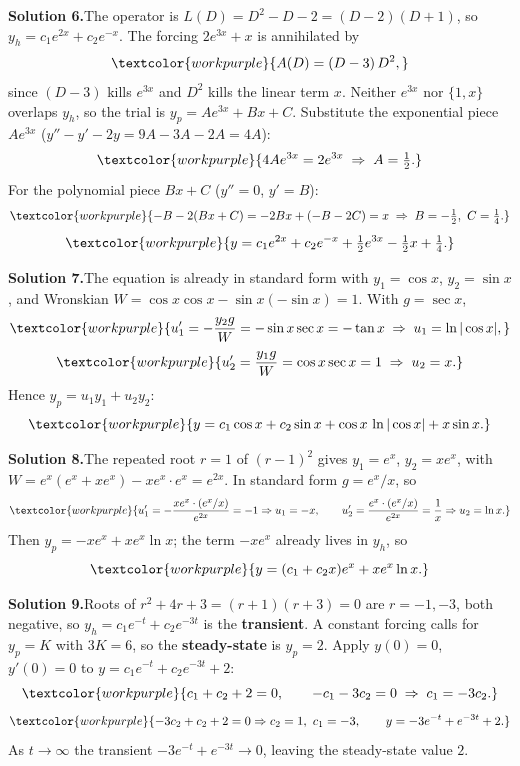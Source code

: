 \medskip
\noindent\textbf{Solution 6.}\quad The operator is $L(D) = D^2 - D - 2 = (D-2)(D+1)$,
so $y_h = c_1 e^{2x} + c_2 e^{-x}$. The forcing $2e^{3x} + x$ is annihilated by
\[ \textcolor{workpurple}{A(D) = (D-3)\,D^2,} \]
since $(D-3)$ kills $e^{3x}$ and $D^2$ kills the linear term $x$. Neither $e^{3x}$
nor $\{1, x\}$ overlaps $y_h$, so the trial is $y_p = A e^{3x} + Bx + C$.
Substitute the exponential piece $Ae^{3x}$ ($y''-y'-2y = 9A - 3A - 2A = 4A$):
\[ \textcolor{workpurple}{4A e^{3x} = 2 e^{3x} \;\Rightarrow\; A = \tfrac{1}{2}.} \]
For the polynomial piece $Bx + C$ ($y'' = 0$, $y' = B$):
\[ \textcolor{workpurple}{-B - 2(Bx + C) = -2Bx + (-B - 2C) = x \;\Rightarrow\; B = -\tfrac{1}{2},\ C = \tfrac{1}{4}.} \]
\[ \textcolor{workpurple}{y = c_1 e^{2x} + c_2 e^{-x} + \tfrac{1}{2} e^{3x} - \tfrac{1}{2}x + \tfrac{1}{4}.} \]

\medskip
\noindent\textbf{Solution 7.}\quad The equation is already in standard form with
$y_1 = \cos x$, $y_2 = \sin x$, and Wronskian
$W = \cos x\cos x - \sin x(-\sin x) = 1$. With $g = \sec x$,
\[ \textcolor{workpurple}{u_1' = -\frac{y_2 g}{W} = -\sin x \sec x = -\tan x \;\Rightarrow\; u_1 = \ln|\cos x|,} \]
\[ \textcolor{workpurple}{u_2' = \frac{y_1 g}{W} = \cos x \sec x = 1 \;\Rightarrow\; u_2 = x.} \]
Hence $y_p = u_1 y_1 + u_2 y_2$:
\[ \textcolor{workpurple}{y = c_1\cos x + c_2\sin x + \cos x\,\ln|\cos x| + x\sin x.} \]

\medskip
\noindent\textbf{Solution 8.}\quad The repeated root $r=1$ of $(r-1)^2$ gives
$y_1 = e^{x}$, $y_2 = x e^{x}$, with
$W = e^{x}(e^{x} + x e^{x}) - x e^{x}\cdot e^{x} = e^{2x}$. In standard form
$g = e^{x}/x$, so
\[ \textcolor{workpurple}{u_1' = -\frac{x e^{x}\cdot (e^{x}/x)}{e^{2x}} = -1 \Rightarrow u_1 = -x, \qquad
   u_2' = \frac{e^{x}\cdot (e^{x}/x)}{e^{2x}} = \frac{1}{x} \Rightarrow u_2 = \ln x.} \]
Then $y_p = -x e^{x} + x e^{x}\ln x$; the term $-x e^{x}$ already lives in $y_h$, so
\[ \textcolor{workpurple}{y = (c_1 + c_2 x)e^{x} + x e^{x}\ln x.} \]

\medskip
\noindent\textbf{Solution 9.}\quad Roots of $r^2 + 4r + 3 = (r+1)(r+3)=0$ are
$r=-1,-3$, both negative, so $y_h = c_1 e^{-t} + c_2 e^{-3t}$ is the
\textbf{transient}. A constant forcing calls for $y_p = K$ with $3K = 6$, so the
\textbf{steady-state} is $y_p = 2$. Apply $y(0)=0$, $y'(0)=0$ to
$y = c_1 e^{-t} + c_2 e^{-3t} + 2$:
\[ \textcolor{workpurple}{c_1 + c_2 + 2 = 0, \qquad -c_1 - 3c_2 = 0 \;\Rightarrow\; c_1 = -3c_2.} \]
\[ \textcolor{workpurple}{-3c_2 + c_2 + 2 = 0 \Rightarrow c_2 = 1,\ c_1 = -3, \qquad y = -3e^{-t} + e^{-3t} + 2.} \]
As $t\to\infty$ the transient $-3e^{-t}+e^{-3t}\to 0$, leaving the steady-state
value $2$.

